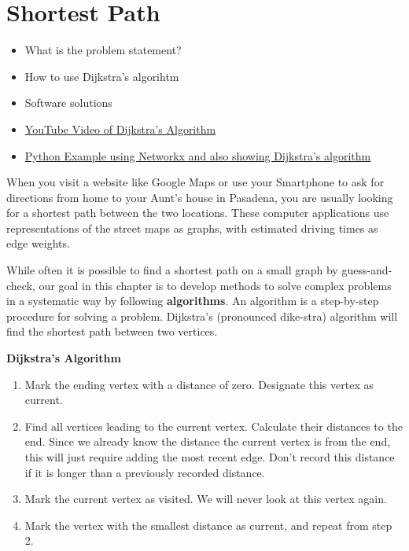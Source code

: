 \section{Shortest Path}
\begin{outcome}
\begin{itemize}
\item What is the problem statement?
\item How to use Dijkstra's algorihtm
\item Software solutions
\end{itemize}
\end{outcome}
\begin{resource}
\begin{itemize}
\item \href{https://youtu.be/EFg3u_E6eHU}{YouTube Video of Dijkstra's Algorithm}
\item \href{https://github.com/open-optimization/open-optimization-or-book/blob/master/instructive-code/networkx%20example%20-%20Dijkstra's%20Algorithm.ipynb}{Python Example using Networkx and also showing Dijkstra's algorithm}
\end{itemize}
\end{resource}
When you visit a website like Google Maps or use your Smartphone to ask for directions from home to your Aunt's house in Pasadena, you are usually looking for a shortest path between the two locations.  These computer applications use representations of the street maps as graphs, with estimated driving times as edge weights.

While often it is possible to find a shortest path on a small graph by guess-and-check, our goal in this chapter is to develop methods to solve complex problems in a systematic way by following \textbf{algorithms}.  An algorithm is a step-by-step procedure for solving a problem.  Dijkstra's (pronounced dike-stra) algorithm will find the shortest path between two vertices.


{\Large \textbf{Dijkstra's Algorithm} } \\
\hspace{3in}

\begin{enumerate}
\item	Mark the ending vertex with a distance of zero.  Designate this vertex as current.
\item Find all vertices leading to the current vertex.  Calculate their distances to the end.  Since we already know the distance the current vertex is from the end, this will just require adding the most recent edge.  Don't record this distance if it is longer than a previously recorded distance.
\item	Mark the current vertex as visited.  We will never look at this vertex again.
\item	Mark the vertex with the smallest distance as current, and repeat from step 2.
\end{enumerate}

